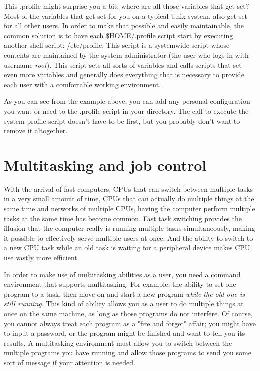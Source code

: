 This .profile might surprise you a bit: where are all those variables that get
set? Most of the variables that get set for you on a typical Unix system, also
get set for all other users. In order to make that possible and easily
maintainable, the common solution is to have each \$HOME/.profile script start
by executing another shell script: /etc/profile. This script is a
systemwide script whose contents are maintained by the system administrator
(the user who logs in with username \textit{root}). This script sets all sorts
of variables and calls scripts that set even more variables and generally does
everything that is necessary to provide each user with a comfortable working
environment.

As you can see from the example above, you can add any personal configuration
you want or need to the .profile script in your directory. The call to execute
the system profile script doesn't have to be first, but you probably don't want
to remove it altogether.

\section{Multitasking and job control}
With the arrival of fast computers, CPUs that can switch between multiple tasks
in a very small amount of time, CPUs that can actually do multiple things at
the same time and networks of multiple CPUs, having the computer perform
multiple tasks at the same time has become common. Fast task switching provides
the illusion that the computer really is running multiple tasks simultaneously,
making it possible to effectively serve multiple users at once. And the ability
to switch to a new CPU task while an old task is waiting for a peripheral
device makes CPU use vastly more efficient.

In order to make use of multitasking abilities as a user, you need a command
environment that supports multitasking. For example, the ability to set one
program to a task, then move on and start a new program \textit{while the old
one is still running}. This kind of ability allows you as a user to do multiple
things at once on the same machine, as long as those programs do not interfere.
Of course, you cannot always treat each program as a "fire and forget" affair;
you might have to input a password, or the program might be finished and want
to tell you its results. A multitasking environment must allow you to switch
between the multiple programs you have running and allow those programs to send
you some sort of message if your attention is needed.

